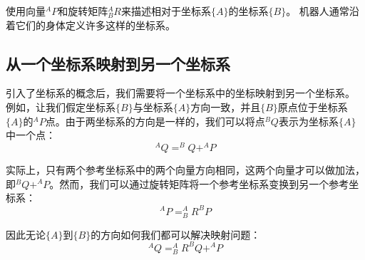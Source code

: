 使用向量$^AP$和旋转矩阵$^A_BR$来描述相对于坐标系$\{A\}$的坐标系$\{B\}$。 机器人通常沿着它们的身体定义许多这样的坐标系。

\subsection{从一个坐标系映射到另一个坐标系}


引入了坐标系的概念后，我们需要将一个坐标系中的坐标映射到另一个坐标系。 例如，让我们假定坐标系$\{B\}$与坐标系$\{A\}$方向一致，并且$\{B\}$原点位于坐标系$\{A\}$的$^AP$点。由于两坐标系的方向是一样的，我们可以将点$^BQ$表示为坐标系$ \{A\} $中一个点：
\begin{equation}
^AQ=^BQ+^AP
\end{equation}
%

实际上，只有两个参考坐标系中的两个向量方向相同，这两个向量才可以做加法，即$ ^BQ + ^AP $。然而，我们可以通过旋转矩阵将一个参考坐标系变换到另一个参考坐标系：
\begin{equation}
^AP=^A_BR^BP
\end{equation}
%

因此无论$\{A\}$到$ \{B\} $的方向如何我们都可以解决映射问题：
\begin{equation}
^AQ=^A_BR^BQ+^AP
\end{equation}


